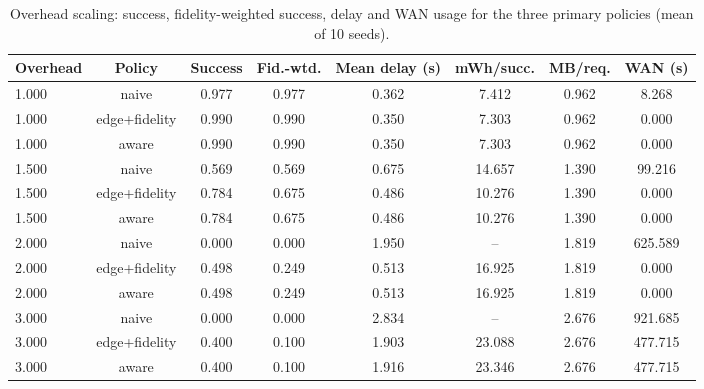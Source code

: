 \begin{table}
\centering
\scriptsize
\caption{Overhead scaling: success, fidelity-weighted success, delay and WAN usage for the three primary policies (mean of 10 seeds).}
\label{tab:p2-multiplier}
\begin{tabular}{lccccccc}
\toprule
Overhead & Policy & Success & Fid.-wtd. & Mean delay (s) & mWh/succ. & MB/req. & WAN (s) \\
\midrule
1.000 & naive & 0.977 & 0.977 & 0.362 & 7.412 & 0.962 & 8.268 \\
1.000 & edge+fidelity & 0.990 & 0.990 & 0.350 & 7.303 & 0.962 & 0.000 \\
1.000 & aware & 0.990 & 0.990 & 0.350 & 7.303 & 0.962 & 0.000 \\
1.500 & naive & 0.569 & 0.569 & 0.675 & 14.657 & 1.390 & 99.216 \\
1.500 & edge+fidelity & 0.784 & 0.675 & 0.486 & 10.276 & 1.390 & 0.000 \\
1.500 & aware & 0.784 & 0.675 & 0.486 & 10.276 & 1.390 & 0.000 \\
2.000 & naive & 0.000 & 0.000 & 1.950 & -- & 1.819 & 625.589 \\
2.000 & edge+fidelity & 0.498 & 0.249 & 0.513 & 16.925 & 1.819 & 0.000 \\
2.000 & aware & 0.498 & 0.249 & 0.513 & 16.925 & 1.819 & 0.000 \\
3.000 & naive & 0.000 & 0.000 & 2.834 & -- & 2.676 & 921.685 \\
3.000 & edge+fidelity & 0.400 & 0.100 & 1.903 & 23.088 & 2.676 & 477.715 \\
3.000 & aware & 0.400 & 0.100 & 1.916 & 23.346 & 2.676 & 477.715 \\
\bottomrule
\end{tabular}
\par\vspace{2pt}{\footnotesize\raggedright The edge-only policy carries the same fidelity ladder as the aware orchestrator; its rows are the test of whether joint selection adds anything.\par}
\end{table}
